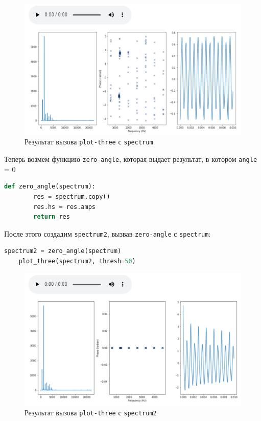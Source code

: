 \documentclass[a4paper]{article}
\begin{document}
            \begin{figure}[H]
                \centering
                \includegraphics[width=\textwidth]{ex_3_spectrum.png}
                \caption{Результат вызова \texttt{plot-three} с \texttt{spectrum}}
                \label{fig:ex_3_spectrum}
            \end{figure}
            
            Теперь возмем функцию \texttt{zero-angle}, которая выдает результат, в котором \texttt{angle} = 0
            
\begin{lstlisting}[language=Python, caption= Функция \texttt{zero-angle}]
    def zero_angle(spectrum):
        res = spectrum.copy()
        res.hs = res.amps
        return res
\end{lstlisting} 
            
            После этого создадим \texttt{spectrum2}, вызвав \texttt{zero-angle} с \texttt{spectrum}:
            
\begin{lstlisting}[language=Python, caption= Вызов \texttt{plot-three} с \texttt{spectrum2}]
    spectrum2 = zero_angle(spectrum)
    plot_three(spectrum2, thresh=50)
\end{lstlisting} 
            
            \begin{figure}[H]
                \centering
                \includegraphics[width=\textwidth]{ex_3_spectrum2.png}
                \caption{Результат вызова \texttt{plot-three} с \texttt{spectrum2}}
                \label{fig:ex_3_spectrum2}
            \end{figure}
            
\end{document}

